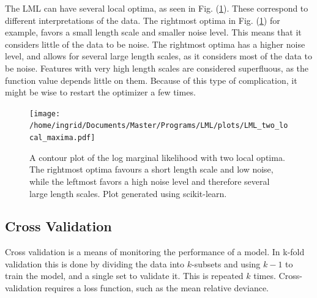 \documentclass[twoside,english]{uiofysmaster}
\begin{document}
The LML can have several local optima, as seen in Fig. (\ref{Fig:: gaussian process : LML several local optima}). These correspond to different interpretations of the data. The rightmost optima in Fig. (\ref{Fig:: gaussian process : LML several local optima}) for example, favors a small length scale and smaller noise level. This means that it considers little of the data to be noise. The rightmost optima has a higher noise level, and allows for several large length scales, as it considers most of the data to be noise. Features with very high length scales are considered superfluous, as the function value depends little on them. Because of this type of complication, it might be wise to restart the optimizer a few times.

\begin{figure}
\centering
\texttt{[image: /home/ingrid/Documents/Master/Programs/LML/plots/LML\_two\_local\_maxima.pdf]}
\caption{A contour plot of the log marginal likelihood with two local optima. The rightmost optima favours a short length scale and low noise, while the leftmost favors a high noise level and therefore several large length scales. Plot generated using scikit-learn.}
\label{Fig:: gaussian process : LML several local optima}
\end{figure}


\subsection{Cross Validation}

Cross validation is a means of monitoring the performance of a model. In k-fold validation this is done by dividing the data into $k$-subsets and using $k-1$ to train the model, and a single set to validate it. This is repeated $k$ times. Cross-validation requires a loss function, such as the mean relative deviance. 


\end{document}
